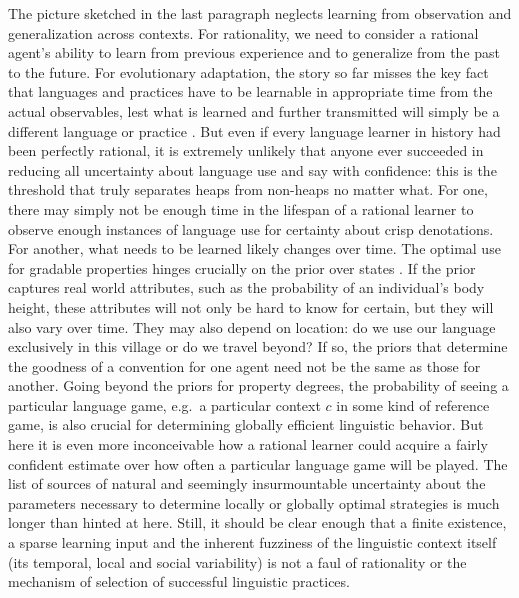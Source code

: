 \documentclass[a4paper]{article}
\begin{document}
The picture sketched in the last paragraph neglects learning from observation and generalization across contexts. 
For rationality, we need to consider a rational agent's ability to learn from previous experience and to generalize from  the past to the future. 
For evolutionary adaptation, the story so far misses the key fact that languages and practices have to be learnable in appropriate time from the actual observables, lest what is learned and further transmitted will simply be a different language or practice \parencite[\emph{e.g.}][]{KirbyGriffith2014:Iterated-Learni}.
But even if every language learner in history had been perfectly rational, it is extremely unlikely that anyone ever succeeded in reducing all uncertainty about language use and say with confidence: this is the threshold that truly separates heaps from non-heaps no matter what. 
For one, there may simply not be enough time in the lifespan of a rational learner to observe enough instances of language use for certainty about crisp denotations. 
For another, what needs to be learned likely changes over time. 
The optimal use for gradable properties hinges crucially on the prior over states \parencite[\emph{e.g.}][]{Franke2012:Scales-Salience,Franke2012:On-Scales-Salie,QingFranke2014:Gradable-Adject,LassiterGoodman2015:Adjectival-vagu}. 
If the prior captures real world attributes, such as the probability of an individual's body height, these attributes will not only be hard to know for certain, but they will also vary over time. 
They may also depend on location: do we use our language exclusively in this village or do we travel beyond? 
If so, the priors that determine the goodness of a convention for one agent need not be the same as those for another. 
Going beyond the priors for property degrees, the probability of seeing a particular language game, e.g.~a particular context $c$ in some kind of reference game, is also crucial for determining globally efficient linguistic behavior. 
But here it is even more inconceivable how a rational learner could acquire a fairly confident estimate over how often a particular language game will be played. 
The list of sources of natural and seemingly insurmountable uncertainty about the parameters necessary to determine locally or globally optimal strategies is much longer than hinted at here. 
Still, it should be clear enough that a finite existence, a sparse learning input and the inherent fuzziness of the linguistic context itself (its temporal, local and social variability) is not a faul of rationality or the mechanism of selection of successful linguistic practices. 
\end{document}

